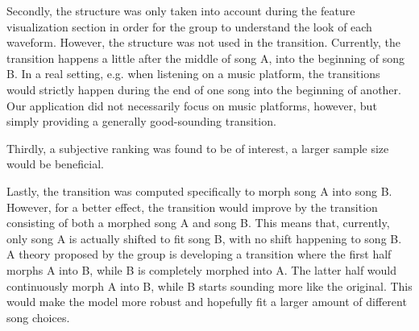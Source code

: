 \documentclass[12pt]{article}
\begin{document}
Secondly, the structure was only taken into account during the feature visualization section in order for the group to understand the look of each waveform. However, the structure was not used in the transition. Currently, the transition happens a little after the middle of song A, into the beginning of song B. In a real setting, e.g. when listening on a music platform, the transitions would strictly happen during the end of one song into the beginning of another. Our application did not necessarily focus on music platforms, however, but simply providing a generally good-sounding transition.

Thirdly, a subjective ranking was found to be of interest, a larger sample size would be beneficial.

Lastly, the transition was computed specifically to morph song A into song B. However, for a better effect, the transition would improve by the transition consisting of both a morphed song A and song B. This means that, currently, only song A is actually shifted to fit song B, with no shift happening to song B. A theory proposed by the group is developing a transition where the first half morphs A into B, while B is completely morphed into A. The latter half would continuously morph A into B, while B starts sounding more like the original. This would make the model more robust and hopefully fit a larger amount of different song choices.









\end{document}
